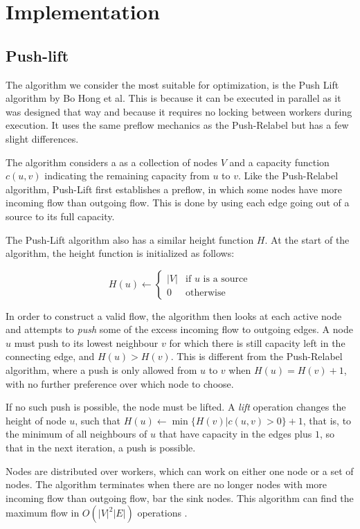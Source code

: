 \chapter{Implementation}

\section{Push-lift}

The algorithm we consider the most suitable for optimization, is the Push Lift algorithm by Bo Hong et al. This is because it can be executed in parallel as it was designed that way and because it requires no locking between workers during execution. It uses the same preflow mechanics as the Push-Relabel \cite{ANewApproachToTheMaxFlowProblem} but has a few slight differences.

The algorithm considers a as a collection of nodes $V$ and a capacity function $c(u, v)$ indicating the remaining capacity from $u$ to $v$. Like the Push-Relabel algorithm, Push-Lift first establishes a preflow, in which some nodes have more incoming flow than outgoing flow. This is done by using each edge going out of a source to its full capacity.

The Push-Lift algorithm also has a similar height function $H$. At the start of the algorithm, the height function is initialized as follows:

$$
H(u) \gets \begin{cases}
	|V| & \text{if } u \text{ is a source} \\
	0 & \text{otherwise}
\end{cases}
$$

In order to construct a valid flow, the algorithm then looks at each active node  and attempts to \emph{push} some of the excess incoming flow to outgoing edges. A node $u$ must push to its lowest neighbour $v$ for which there is still capacity left in the connecting edge, and $H(u) > H(v)$. This is different from the Push-Relabel algorithm, where a push is only allowed from $u$ to $v$ when $H(u) = H(v) + 1$, with no further preference over which node to choose.

If no such push is possible, the node must be lifted. A \emph{lift} operation changes the height of node $u$, such that $H(u) \gets \min\{H(v) | c(u, v) > 0\} + 1$, that is, to the minimum of all neighbours of $u$ that have capacity in the edges plus $1$, so that in the next iteration, a push is possible.

Nodes are distributed over workers, which can work on either one node or a set of nodes. The algorithm terminates when there are no longer nodes with more incoming flow than outgoing flow, bar the sink nodes. This algorithm can find the maximum flow in $O(|V|^2|E|)$ operations \cite{LockFreeMultithreadedMaxFlow}.

